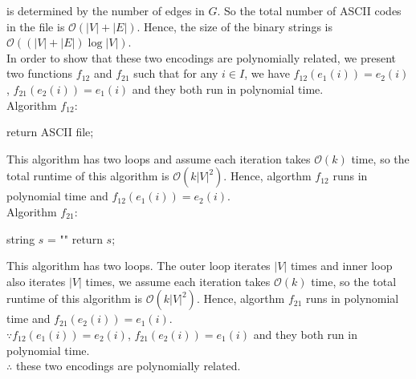 \documentclass[12pt,letterpaper]{article}
\begin{document}
is determined by the number of edges in $G$. So the total number of ASCII codes in the file is $\mathcal{O}(|V|+|E|)$. Hence, the
size of the binary strings is $\mathcal{O}((|V|+|E|) \log|V|)$. \\
In order to show that these two encodings are polynomially related, we present two functions $f_{12}$ and $f_{21}$ such that
for any $i \in I$, we have $f_{12}(e_1(i)) = e_2(i)$, $f_{21}(e_2(i)) = e_1(i)$ and they both run in polynomial time. \\
Algorithm $f_{12}$: \\
\begin{algorithm}[H]
return ASCII file;
\end{algorithm}
This algorithm has two loops and assume each iteration takes $\mathcal{O}(k)$ time, so the total runtime of this algorithm is $\mathcal{O}(k|V|^2)$.
Hence, algorthm $f_{12}$ runs in polynomial time and $f_{12}(e_1(i)) = e_2(i)$. \\
Algorithm $f_{21}$: \\
\begin{algorithm}[H]
string $s$ = "" \;
return $s$;
\end{algorithm}
This algorithm has two loops. The outer loop iterates $|V|$ times and inner loop also iterates $|V|$ times,
we assume each iteration takes $\mathcal{O}(k)$ time, so the total runtime of this algorithm is $\mathcal{O}(k|V|^2)$.
Hence, algorthm $f_{21}$ runs in polynomial time and $f_{21}(e_2(i)) = e_1(i)$. \\
$\because f_{12}(e_1(i)) = e_2(i)$, $f_{21}(e_2(i)) = e_1(i)$ and they both run in polynomial time. \\
$\therefore$ these two encodings are polynomially related.
\end{document}
